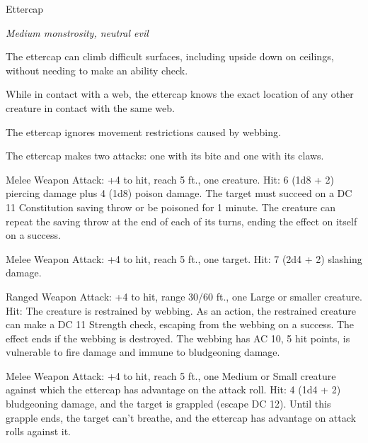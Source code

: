 \begin{monsterbox}{Ettercap}
\begin{hangingpar}
\textit{Medium monstrosity, neutral evil}
\end{hangingpar}
\dndline%
\basics[%
armorclass = 13,
hitpoints = 8d8 + 8,
speed = {30 ft., climb 30 ft.}
]
\dndline%
\stats[%
STR = \stat{14},
DEX = \stat{15},
CON = \stat{13},
INT = \stat{7},
WIS = \stat{12},
CHA = \stat{8}
]
\dndline%
\details[%
skills={Stealth +4, Perception +3, Survival +3, },
damageimmunities={},
savingthrows={},
conditionimmunities={},
damageresistances={},
damagevulnerabilities={},
senses={darkvision 60 ft., passive Perception 13},
challenge=2
]
\dndline%
\begin{monsteraction}
The ettercap can climb difficult surfaces, including upside down on ceilings, without needing to make an ability check.
\end{monsteraction}
\begin{monsteraction}
While in contact with a web, the ettercap knows the exact location of any other creature in contact with the same web.
\end{monsteraction}
\begin{monsteraction}
The ettercap ignores movement restrictions caused by webbing.
\end{monsteraction}
\begin{monsteraction}[Multiattack]
The ettercap makes two attacks: one with its bite and one with its claws.
\end{monsteraction}
\begin{monsteraction}[Bite]
Melee Weapon Attack: +4 to hit, reach 5 ft., one creature. Hit: 6 (1d8 + 2) piercing damage plus 4 (1d8) poison damage. The target must succeed on a DC 11 Constitution saving throw or be poisoned for 1 minute. The creature can repeat the saving throw at the end of each of its turns, ending the effect on itself on a success.
\end{monsteraction}
\begin{monsteraction}[Claws]
Melee Weapon Attack: +4 to hit, reach 5 ft., one target. Hit: 7 (2d4 + 2) slashing damage.
\end{monsteraction}
\begin{monsteraction}
Ranged Weapon Attack: +4 to hit, range 30/60 ft., one Large or smaller creature. Hit: The creature is restrained by webbing. As an action, the restrained creature can make a DC 11 Strength check, escaping from the webbing on a success. The effect ends if the webbing is destroyed. The webbing has AC 10, 5 hit points, is vulnerable to fire damage and immune to bludgeoning damage.
\end{monsteraction}
\begin{monsteraction}
Melee Weapon Attack: +4 to hit, reach 5 ft., one Medium or Small creature against which the ettercap has advantage on the attack roll. Hit: 4 (1d4 + 2) bludgeoning damage, and the target is grappled (escape DC 12). Until this grapple ends, the target can't breathe, and the ettercap has advantage on attack rolls against it.
\end{monsteraction}
\end{monsterbox}